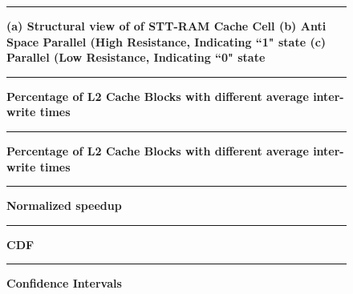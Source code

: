 \begin{wrapfigure}{l}{0.50\textwidth}
\centering
 \hrule
 \caption{\label{fig:motiv} \scriptsize \bf (a) Structural view of of STT-RAM Cache Cell (b) Anti Space Parallel (High Resistance, Indicating ``1" state (c) Parallel (Low Resistance, Indicating ``0" state}
\end{wrapfigure}

\begin{figure*} [t]
\centering
 \hrule
 \caption{\label{fig:avg-parsec} \scriptsize \bf Percentage of L2 Cache Blocks with different average inter-write times}
\end{figure*}

\begin{figure*} [t]
\centering
 \hrule
 \caption{\label{fig:avg-spec} \scriptsize \bf Percentage of L2 Cache Blocks with different average inter-write times}
\end{figure*}

\begin{figure*} [t]
\centering
 \hrule
 \caption{\label{fig:parsec-speedup} \scriptsize \bf Normalized speedup }
\end{figure*}

\begin{figure*} [t]
\centering
 \hrule
 \caption{\label{fig:cdf} \scriptsize \bf CDF}
\end{figure*}

\begin{figure*} [t]
\centering
 \hrule
 \caption{\label{fig:confi} \scriptsize \bf Confidence Intervals}
\end{figure*}

